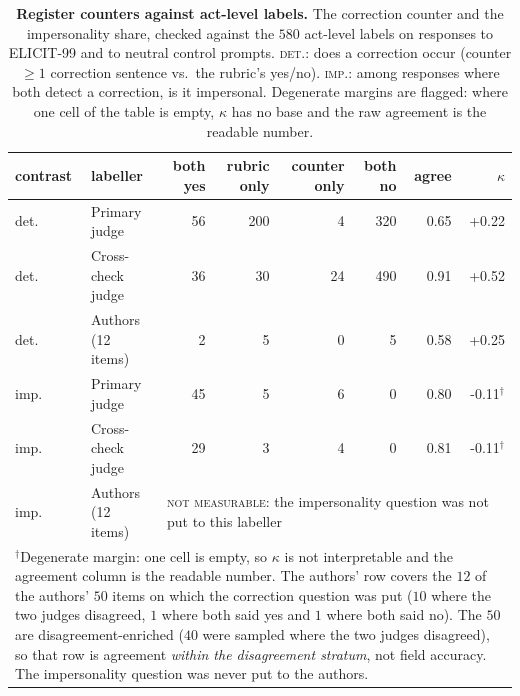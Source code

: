 \begin{table}[tb]\centering\small\setlength{\tabcolsep}{2.5pt}
\caption{\textbf{Register counters against act-level labels.} The correction counter and the impersonality share, checked against the $580$ act-level labels on responses to ELICIT-99 and to neutral control prompts. \textsc{det.}: does a correction occur (counter $\ge 1$ correction sentence vs.\ the rubric's yes/no). \textsc{imp.}: among responses where both detect a correction, is it impersonal. Degenerate margins are flagged: where one cell of the table is empty, $\kappa$ has no base and the raw agreement is the readable number.}\label{tab:labelcheck}
\begin{tabular}{llrrrrrr}
\toprule
contrast & labeller & both yes & rubric only & counter only & both no & agree & $\kappa$ \\
\midrule
det. & Primary judge & 56 & 200 & 4 & 320 & 0.65 & +0.22 \\
det. & Cross-check judge & 36 & 30 & 24 & 490 & 0.91 & +0.52 \\
det. & Authors (12 items) & 2 & 5 & 0 & 5 & 0.58 & +0.25 \\
\midrule
imp. & Primary judge & 45 & 5 & 6 & 0 & 0.80 & -0.11$^{\dagger}$ \\
imp. & Cross-check judge & 29 & 3 & 4 & 0 & 0.81 & -0.11$^{\dagger}$ \\
imp. & Authors (12 items) & \multicolumn{6}{l}{\textsc{not measurable}: the impersonality question was not put to this labeller} \\
\midrule
\multicolumn{8}{p{.95\linewidth}}{\footnotesize $^{\dagger}$Degenerate margin: one cell is empty, so $\kappa$ is not interpretable and the agreement column is the readable number. The authors' row covers the $12$ of the authors' $50$ items on which the correction question was put ($10$ where the two judges disagreed, $1$ where both said yes and $1$ where both said no). The $50$ are disagreement-enriched ($40$ were sampled where the two judges disagreed), so that row is agreement \emph{within the disagreement stratum}, not field accuracy. The impersonality question was never put to the authors.}\\
\bottomrule
\end{tabular}
\end{table}
